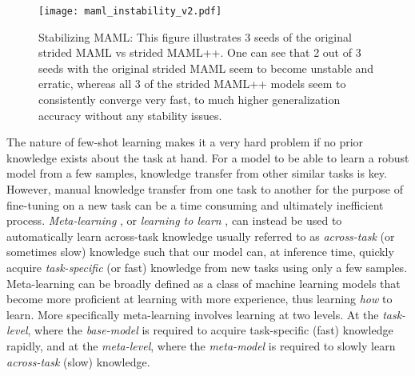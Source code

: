 \documentclass{article} \usepackage[dvipsnames]{xcolor}
\begin{document}
\begin{figure}[!htbp]
	\centering
	\texttt{[image: maml\_instability\_v2.pdf]}
    \caption{Stabilizing MAML: This figure illustrates 3 seeds of the original strided MAML vs strided MAML++. One can see that 2 out of 3 seeds with the original strided MAML seem to become unstable and erratic, whereas all 3 of the strided MAML++ models seem to consistently converge very fast, to much higher generalization accuracy without any stability issues.}
	\label{figure:maml-stability}
\end{figure}

The nature of few-shot learning makes it a very hard problem if no prior knowledge exists about the task at hand. For a model to be able to learn a robust model from a few samples, knowledge transfer \citep[see e.g.\ ][]{caruana1995learning} from other similar tasks is key. However, manual knowledge transfer from one task to another for the purpose of fine-tuning on a new task can be a time consuming and ultimately inefficient process. \emph{Meta-learning} \citep{schmidhuber1987evolutionary,vilalta2002perspective}, or \emph{learning to learn} \citep{thrun1998learning}, can instead be used to automatically learn across-task knowledge usually referred to as \emph{across-task} (or sometimes slow) knowledge such that our model can, at inference time, quickly acquire \emph{task-specific} (or fast) knowledge from new tasks using only a few samples. Meta-learning can be broadly defined as a class of machine learning models that become more proficient at learning with more experience, thus learning \emph{how} to learn. More specifically meta-learning involves learning at two levels. At the \emph{task-level}, where the \emph{base-model} is required to acquire task-specific (fast) knowledge rapidly, and at the \emph{meta-level}, where the \emph{meta-model} is required to slowly learn \emph{across-task} (slow) knowledge. 
\end{document}
